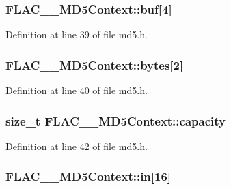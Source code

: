 \subsubsection[{\texorpdfstring{buf}{buf}}]{ F\+L\+A\+C\+\_\+\+\_\+\+M\+D5\+Context\+::buf\mbox{[}4\mbox{]}}\hypertarget{struct_f_l_a_c_____m_d5_context_a7dd3d0c0eb260f86416b2e8bff622d67}{}\label{struct_f_l_a_c_____m_d5_context_a7dd3d0c0eb260f86416b2e8bff622d67}


Definition at line 39 of file md5.\+h.

\subsubsection[{\texorpdfstring{bytes}{bytes}}]{ F\+L\+A\+C\+\_\+\+\_\+\+M\+D5\+Context\+::bytes\mbox{[}2\mbox{]}}\hypertarget{struct_f_l_a_c_____m_d5_context_aebfc21f5b69155bcfeecec943671c626}{}\label{struct_f_l_a_c_____m_d5_context_aebfc21f5b69155bcfeecec943671c626}


Definition at line 40 of file md5.\+h.

\subsubsection[{\texorpdfstring{capacity}{capacity}}]{\setlength{\rightskip}{0pt plus 5cm}size\+\_\+t F\+L\+A\+C\+\_\+\+\_\+\+M\+D5\+Context\+::capacity}\hypertarget{struct_f_l_a_c_____m_d5_context_a5d61a6ea6ac40a2d1fd701dbf23285a5}{}\label{struct_f_l_a_c_____m_d5_context_a5d61a6ea6ac40a2d1fd701dbf23285a5}


Definition at line 42 of file md5.\+h.

\subsubsection[{\texorpdfstring{in}{in}}]{ F\+L\+A\+C\+\_\+\+\_\+\+M\+D5\+Context\+::in\mbox{[}16\mbox{]}}\hypertarget{struct_f_l_a_c_____m_d5_context_adfd8c61d39529ba86c35002bcd557d69}{}\label{struct_f_l_a_c_____m_d5_context_adfd8c61d39529ba86c35002bcd557d69}


